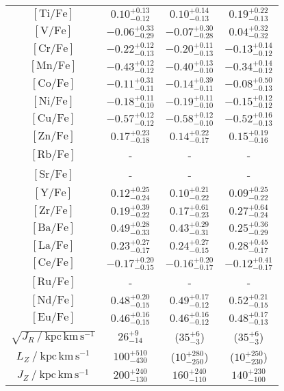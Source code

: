 \begin{table}
\begin{tabular}{cccc}
$\mathrm{[Ti/Fe]}$ & $0.10_{-0.12}^{+0.13}$ & $0.10_{-0.13}^{+0.14}$ & $0.19_{-0.13}^{+0.22}$ \\
$\mathrm{[V/Fe]}$ & $-0.06_{-0.29}^{+0.33}$ & $-0.07_{-0.28}^{+0.30}$ & $0.04_{-0.32}^{+0.32}$ \\
$\mathrm{[Cr/Fe]}$ & $-0.22_{-0.13}^{+0.12}$ & $-0.20_{-0.13}^{+0.11}$ & $-0.13_{-0.12}^{+0.14}$ \\
$\mathrm{[Mn/Fe]}$ & $-0.43_{-0.12}^{+0.12}$ & $-0.40_{-0.10}^{+0.13}$ & $-0.34_{-0.12}^{+0.14}$ \\
$\mathrm{[Co/Fe]}$ & $-0.11_{-0.11}^{+0.31}$ & $-0.14_{-0.11}^{+0.39}$ & $-0.08_{-0.13}^{+0.50}$ \\
$\mathrm{[Ni/Fe]}$ & $-0.18_{-0.10}^{+0.11}$ & $-0.19_{-0.10}^{+0.11}$ & $-0.15_{-0.12}^{+0.12}$ \\
$\mathrm{[Cu/Fe]}$ & $-0.57_{-0.12}^{+0.12}$ & $-0.58_{-0.10}^{+0.12}$ & $-0.52_{-0.13}^{+0.16}$ \\
$\mathrm{[Zn/Fe]}$ & $0.17_{-0.18}^{+0.23}$ & $0.14_{-0.17}^{+0.22}$ & $0.15_{-0.16}^{+0.19}$ \\
$\mathrm{[Rb/Fe]}$ & - & - & - \\
$\mathrm{[Sr/Fe]}$ & - & - & - \\
$\mathrm{[Y/Fe]}$ & $0.12_{-0.24}^{+0.25}$ & $0.10_{-0.22}^{+0.21}$ & $0.09_{-0.22}^{+0.25}$ \\
$\mathrm{[Zr/Fe]}$ & $0.19_{-0.22}^{+0.39}$ & $0.17_{-0.23}^{+0.61}$ & $0.27_{-0.24}^{+0.64}$ \\
$\mathrm{[Ba/Fe]}$ & $0.49_{-0.33}^{+0.28}$ & $0.43_{-0.31}^{+0.29}$ & $0.25_{-0.29}^{+0.36}$ \\
$\mathrm{[La/Fe]}$ & $0.23_{-0.17}^{+0.27}$ & $0.24_{-0.15}^{+0.27}$ & $0.28_{-0.17}^{+0.45}$ \\
$\mathrm{[Ce/Fe]}$ & $-0.17_{-0.15}^{+0.20}$ & $-0.16_{-0.17}^{+0.20}$ & $-0.12_{-0.17}^{+0.41}$ \\
$\mathrm{[Ru/Fe]}$ & - & - & - \\
$\mathrm{[Nd/Fe]}$ & $0.48_{-0.15}^{+0.20}$ & $0.49_{-0.12}^{+0.17}$ & $0.52_{-0.15}^{+0.21}$ \\
$\mathrm{[Eu/Fe]}$ & $0.46_{-0.15}^{+0.16}$ & $0.46_{-0.12}^{+0.16}$ & $0.48_{-0.13}^{+0.17}$ \\
\hline
$\sqrt{J_R~/~\mathrm{kpc\,km\,s^{-1}}}$ & $26_{-14}^{+9}$ & ($35_{-3}^{+6}$) & ($35_{-3}^{+6}$) \\
$L_Z~/~\mathrm{kpc\,km\,s^{-1}}$ & $100_{-430}^{+510}$ & ($10_{-250}^{+280}$) & ($10_{-230}^{+250}$) \\
$J_Z~/~\mathrm{kpc\,km\,s^{-1}}$ & $200_{-130}^{+240}$ & $160_{-110}^{+240}$ & $140_{-100}^{+230}$ \\

\end{tabular}
\end{table}

